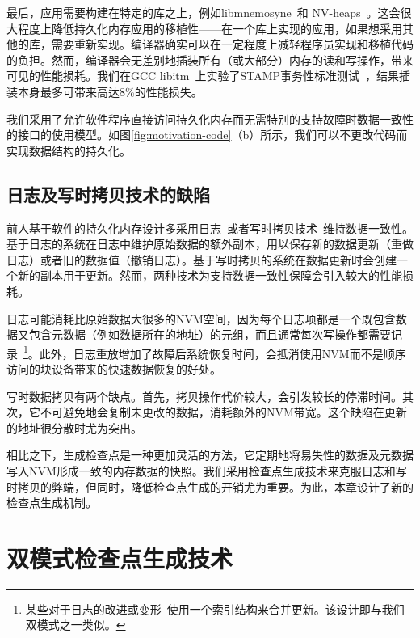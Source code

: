 最后，应用需要构建在特定的库之上，例如libmnemosyne~\cite{Volos:2011:MLP:1950365.1950379}和
NV-heaps~\cite{Coburn:2011:NMP:1950365.1950380}。这会很大程度上降低持久化内存应用的移植性——在一个库上实现的应用，如果想采用其他的库，需要重新实现。编译器确实可以在一定程度上减轻程序员实现和移植代码的负担。然而，编译器会无差别地插装所有（或大部分）内存的读和写操作，带来可见的性能损耗。我们在GCC libitm~\cite{libitm}上实验了STAMP事务性标准测试~\cite{Cao:2008:STA}，结果插装本身最多可带来高达8\%的性能损失。

我们采用了允许软件程序直接访问持久化内存而无需特别的支持故障时数据一致性的接口的使用模型。如图\ref{fig:motivation-code}（b）所示，我们可以不更改代码而实现数据结构的持久化。

\subsection{日志及写时拷贝技术的缺陷}

前人基于软件的持久化内存设计多采用日志~\cite{Volos:2011:MLP:1950365.1950379, Coburn:2011:NMP:1950365.1950380}或者写时拷贝技术~\cite{Condit:2009:BIT:1629575.1629589,
Venkataraman:2011:CDD:1960475.1960480}维持数据一致性。基于日志的系统在日志中维护原始数据的额外副本，用以保存新的数据更新（重做日志）或者旧的数据值（撤销日志）。基于写时拷贝的系统在数据更新时会创建一个新的副本用于更新。然而，两种技术为支持数据一致性保障会引入较大的性能损耗。

日志可能消耗比原始数据大很多的NVM空间，因为每个日志项都是一个既包含数据又包含元数据（例如数据所在的地址）的元组，而且通常每次写操作都需要记录~\cite{Volos:2011:MLP:1950365.1950379,
Coburn:2011:NMP:1950365.1950380}\footnote{某些对于日志的改进或变形~\cite{1003568}使用一个索引结构来合并更新。该设计即与我们双模式之一类似。}。此外，日志重放增加了故障后系统恢复时间，会抵消使用NVM而不是顺序访问的块设备带来的快速数据恢复的好处。

写时数据拷贝有两个缺点。首先，拷贝操作代价较大，会引发较长的停滞时间。其次，它不可避免地会复制未更改的数据，消耗额外的NVM带宽。这个缺陷在更新的地址很分散时尤为突出。

相比之下，生成检查点是一种更加灵活的方法，它定期地将易失性的数据及元数据写入NVM形成一致的内存数据的快照。我们采用检查点生成技术来克服日志和写时拷贝的弊端，但同时，降低检查点生成的开销尤为重要。为此，本章设计了新的检查点生成机制。


\section{双模式检查点生成技术}

